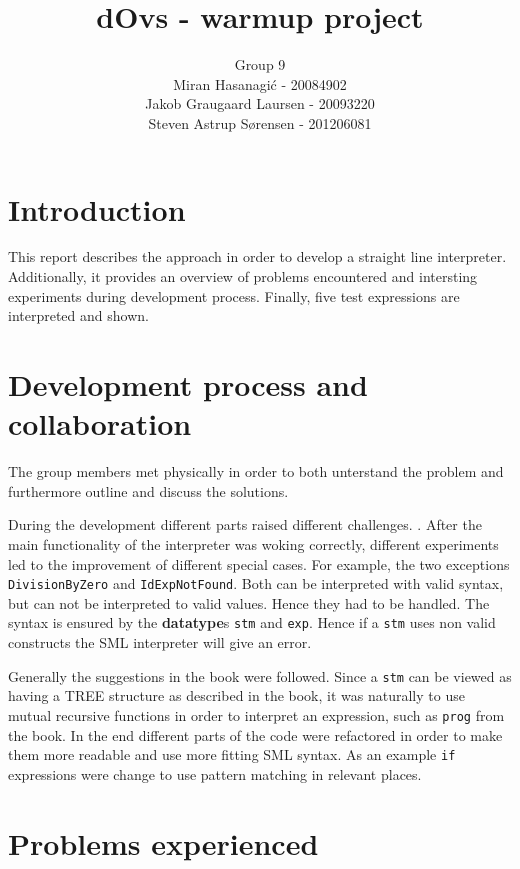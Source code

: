 \documentclass[a4paper]{article}
\title{dOvs - warmup project}
\author{
  Group 9 \\
  Miran Hasanagi\'{c} - 20084902 \\
  Jakob Graugaard Laursen - 20093220\\
  Steven Astrup S\o rensen - 201206081
}
\begin{document}
\maketitle

\section{Introduction}
This report describes the approach in order to develop a straight line interpreter. Additionally, it provides an overview of problems encountered and intersting experiments during development process. Finally, five test expressions are interpreted and shown.

\section{Development process and collaboration}
The group members met physically in order to both unterstand the problem and furthermore outline and discuss the solutions.

During the development different parts raised different challenges. . After the main functionality of the interpreter was woking correctly, different experiments led to the improvement of different special cases. For example, the two exceptions \texttt{DivisionByZero} and \texttt{IdExpNotFound}. Both can be interpreted with valid syntax, but can not be interpreted to valid values. Hence they had to be handled. The syntax is ensured by the \textbf{datatype}s \texttt{stm} and \texttt{exp}. Hence if a \texttt{stm} uses non valid constructs the SML interpreter will give an error.

Generally the suggestions in the book were followed. Since a \texttt{stm} can be viewed as having a TREE structure as described in the book, it was naturally to use mutual recursive functions in order to interpret an expression, such as \texttt{prog} from the book. In the end different parts of the code were refactored in order to make them more readable and use more fitting SML syntax. As an example \texttt{if} expressions were change to use pattern matching in relevant places. 

\section{Problems experienced}
\end{document}
